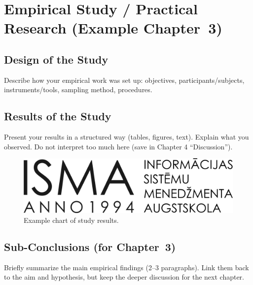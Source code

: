\chapter{Empirical Study / Practical Research (Example Chapter~3)}
\label{chap:empirical}


\section{Design of the Study}
Describe how your empirical work was set up: objectives, participants/subjects, instruments/tools, sampling method, procedures.

\section{Results of the Study}
Present your results in a structured way (tables, figures, text). Explain what you observed. Do not interpret too much here (save in Chapter 4 “Discussion”).

\begin{figure}[h]
  \centering
  \includegraphics[width=0.6\linewidth]{b_chapters/chapter1/assets/isma_logo.png}
  \caption{Example chart of study results.}
  \label{fig:study-results}
\end{figure}

\section{Sub-Conclusions (for Chapter~3)}
Briefly summarize the main empirical findings (2–3 paragraphs). Link them back to the aim and hypothesis, but keep the deeper discussion for the next chapter.

